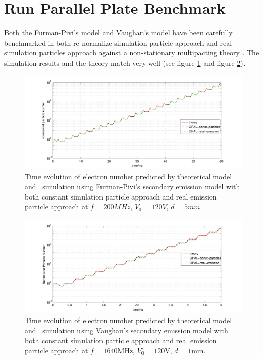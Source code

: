 \clearpage
\section{Run Parallel Plate Benchmark}
\label{sec:RunPP}
Both the Furman-Pivi's model and Vaughan's model have been carefully benchmarked in both re-normalize simulation particle approach and real simulation particles approach against a non-stationary multipacting theory \cite{nonstationary}. The \opal simulation results and the theory match very well (see figure \ref{fig:PPFurman-Pivi} and figure \ref{fig:PPVaughan}).
\begin{figure}[ht]
 \begin{center}
 \includegraphics[width=1\linewidth,angle=0]{figures/Multipacting/const_particle_benchmark_FurmanPivi.pdf}
  \caption{Time evolution of electron number predicted by theoretical model and \opal\ simulation using Furman-Pivi's secondary emission model with both constant simulation particle approach and real emission particle approach at $f=200MHz$, $V_0=120V$, $d=5mm$}
  \label{fig:PPFurman-Pivi}
 \end{center}
\end{figure}  
\begin{figure}[ht]
 \begin{center}
 \includegraphics[width=1\linewidth,angle=0]{figures/Multipacting/const_particle_benchmark.pdf}
  \caption{Time evolution of electron number predicted by theoretical model and \opal\ simulation using Vaughan's secondary emission model with both constant simulation particle approach and real emission particle approach at $f=1640$MHz, $V_0=120$V, $d=1$mm.}
  \label{fig:PPVaughan}
 \end{center}
\end{figure}  

